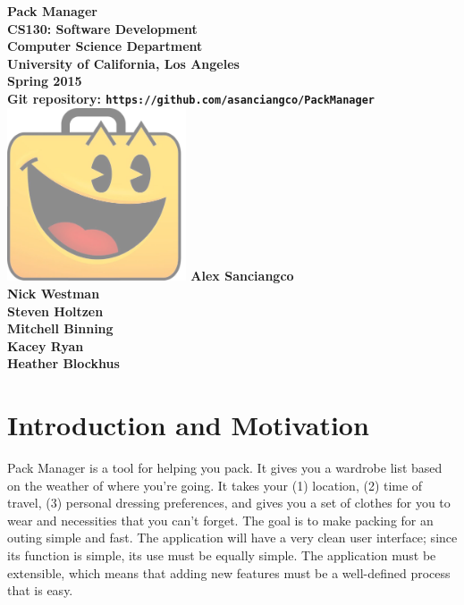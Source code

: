 \documentclass[11pt]{article}
\begin{document}
  \begin{titlepage}
    \centering
    \vspace*{11\baselineskip}
    \large
    \bfseries
    {\LARGE Pack Manager}\\[5\baselineskip]
    \normalfont
    \small
    CS130: Software Development\\
    Computer Science Department\\
    University of California, Los Angeles\\
    Spring 2015\\
    Git repository: \texttt{https://github.com/asanciangco/PackManager} \\[5\baselineskip]

    \includegraphics[width=150pt]{img/pacman.png}
    \vfill
    {\large
	Alex Sanciangco\\
	Nick Westman\\
	Steven Holtzen\\
	Mitchell Binning\\
	Kacey Ryan\\
	Heather Blockhus\\}
  \end{titlepage}

\tableofcontents
\newpage

\section{Introduction and Motivation}
Pack Manager is a tool for helping you pack. It gives you a wardrobe list based on the weather of where you're going. It takes your (1) location, (2) time of travel, (3) personal dressing preferences, and gives you a set of clothes for you to wear and necessities that you can't forget. The goal is to make packing for an outing simple and fast. The application will have a very clean user interface; since its function is simple, its use must be equally simple. The application must be extensible, which means that adding new features must be a well-defined process that is easy.
\end{document}
